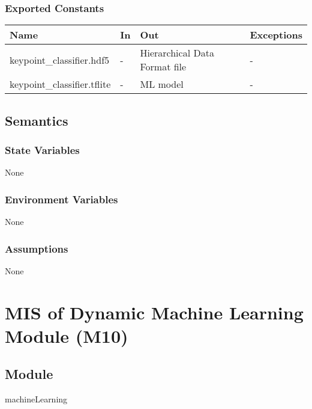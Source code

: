 \documentclass[12pt, titlepage]{article}
\begin{document}
\subsubsection{Exported Constants}

\begin{center}
\begin{tabular}{p{5cm} p{3cm} p{3cm} p{4cm}}
\hline
\textbf{Name} & \textbf{In} & \textbf{Out} & \textbf{Exceptions} \\
\hline
keypoint\_classifier.hdf5 & - & Hierarchical Data Format file & - \\
keypoint\_classifier.tflite & - & ML model & - \\
\hline
\end{tabular}
\end{center}

\subsection{Semantics}

\subsubsection{State Variables}

None\\

\subsubsection{Environment Variables}

None\\

\subsubsection{Assumptions}

None\\

\newpage
\section{MIS of Dynamic Machine Learning Module (M10)} \label{M10}

\subsection{Module}

machineLearning\\
\end{document}
